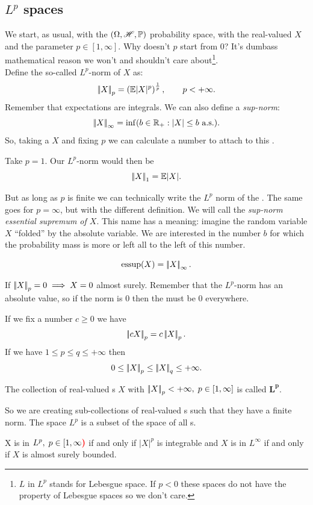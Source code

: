 \documentclass{report}
\begin{document}
\subsection{$L^p$ spaces}
We start, as usual, with the $(\Omega,\mathscr{H},\mathbb{P})$ probability space, with the real-valued \rv{} $X$ and the parameter $p\in[1,\infty]$. Why doesn't $p$ start from 0? It's dumbass mathematical reason we won't and shouldn't care about\footnote{$L$ in $L^p$ stands for Lebesgue space. If $p<0$ these spaces do not have the property of Lebesgue spaces so we don't care.}.\\
Define the so-called $L^p$-norm of $X$ as:
\[\left|\negthinspace\left|X\right|\negthinspace\right|_p=\left(\mathbb{E}|X|^p\right)^{\frac{1}{p}},\qquad p<+\infty.\]
Remember that expectations are integrals. We can also define a \textit{sup-norm}:
\[\left|\negthinspace\left|X\right|\negthinspace\right|_{\infty}=\inf(b\in\mathbb{R}_+:|X|\leq b\text{ a.s.}).\]
So, taking a \rv{} $X$ and fixing $p$ we can calculate a number to attach to this \rv{}.
\begin{example}
	Take $p=1$. Our $L^p$-norm would then be
	\[\left|\negthinspace\left|X\right|\negthinspace\right|_1=\mathbb{E}|X|.\]
\end{example}
But as long as $p$ is finite we can technically write the $L^p$ norm of the \rv. The same goes for $p=\infty$, but with the different definition. We will call the \textit{sup-norm} \emph{essential supremum of $X$}. This name has a meaning: imagine the random variable $X$ ``folded'' by the absolute variable. We are interested in the number $b$ for which the probability mass is more or left all to the left of this number.
\begin{notation}
	\[ \mathrm{essup}(X)= \left|\negthinspace\left|X\right|\negthinspace\right|_{\infty}.\]
\end{notation}
\begin{remark}
	If $\left|\negthinspace\left|X\right|\negthinspace\right|_p=0\implies X=0$ almost surely. Remember that the $L^p$-norm has an absolute value, so if the norm is 0 then the \rv{} must be 0 everywhere. 
\end{remark}
If we fix a number $c\geq0$ we have
\[\left|\negthinspace\left|cX\right|\negthinspace\right|_p=c\left|\negthinspace\left|X\right|\negthinspace\right|_p.\]
If we have $1\leq p\leq q\leq+\infty$ then
\[0\leq\left|\negthinspace\left|X\right|\negthinspace\right|_p\leq\left|\negthinspace\left|X\right|\negthinspace\right|_q\leq+\infty.\]
\begin{definition}
	The collection of real-valued \rv{}s $X$ with $\left|\negthinspace\left|X\right|\negthinspace\right|_p<+\infty,\;p\in[1,\infty]$ is called \emph{$\mathbf{L^p}$}.
\end{definition}
So we are creating sub-collections of real-valued \rv s such that they have a finite norm. The space $L^p$ is a subset of the space of all \rv s.
\begin{remark}
	X is in $L^{p},\;p \in [1,\infty\color{red}\boldsymbol{)}$ if and only if $|X|^{p}$ is integrable and $X$ is in $L^{\infty}$ if and only if $X$ is almost surely bounded.
\end{remark}
\end{document}

